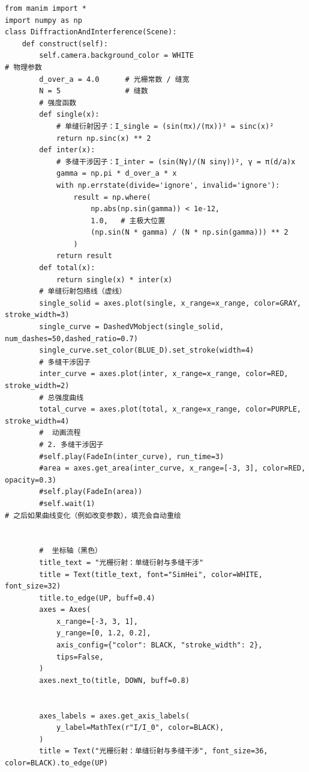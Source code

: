 \documentclass[12pt,a4paper]{ctexrep}
\begin{document}
\begin{lstlisting}[style=pycode]
from manim import *
import numpy as np
class DiffractionAndInterference(Scene):
    def construct(self):
        self.camera.background_color = WHITE
# 物理参数
        d_over_a = 4.0      # 光栅常数 / 缝宽
        N = 5               # 缝数
        # 强度函数
        def single(x):
            # 单缝衍射因子：I_single = (sin(πx)/(πx))² = sinc(x)²
            return np.sinc(x) ** 2
        def inter(x):
            # 多缝干涉因子：I_inter = (sin(Nγ)/(N sinγ))², γ = π(d/a)x
            gamma = np.pi * d_over_a * x
            with np.errstate(divide='ignore', invalid='ignore'):
                result = np.where(
                    np.abs(np.sin(gamma)) < 1e-12,
                    1.0,   # 主极大位置
                    (np.sin(N * gamma) / (N * np.sin(gamma))) ** 2
                )
            return result
        def total(x):
            return single(x) * inter(x)
        # 单缝衍射包络线（虚线）
        single_solid = axes.plot(single, x_range=x_range, color=GRAY, stroke_width=3)
        single_curve = DashedVMobject(single_solid, num_dashes=50,dashed_ratio=0.7)
        single_curve.set_color(BLUE_D).set_stroke(width=4)
        # 多缝干涉因子
        inter_curve = axes.plot(inter, x_range=x_range, color=RED, stroke_width=2)
        # 总强度曲线
        total_curve = axes.plot(total, x_range=x_range, color=PURPLE, stroke_width=4)
        #  动画流程
        # 2. 多缝干涉因子
        #self.play(FadeIn(inter_curve), run_time=3)
        #area = axes.get_area(inter_curve, x_range=[-3, 3], color=RED, opacity=0.3)
        #self.play(FadeIn(area))
        #self.wait(1)
# 之后如果曲线变化（例如改变参数），填充会自动重绘


        #  坐标轴（黑色）
        title_text = "光栅衍射：单缝衍射与多缝干涉"
        title = Text(title_text, font="SimHei", color=WHITE, font_size=32)
        title.to_edge(UP, buff=0.4)
        axes = Axes(
            x_range=[-3, 3, 1],
            y_range=[0, 1.2, 0.2],
            axis_config={"color": BLACK, "stroke_width": 2},
            tips=False,
        )
        axes.next_to(title, DOWN, buff=0.8)


        axes_labels = axes.get_axis_labels(
            y_label=MathTex(r"I/I_0", color=BLACK),
        )
        title = Text("光栅衍射：单缝衍射与多缝干涉", font_size=36, color=BLACK).to_edge(UP)


\end{lstlisting}
\end{document}
